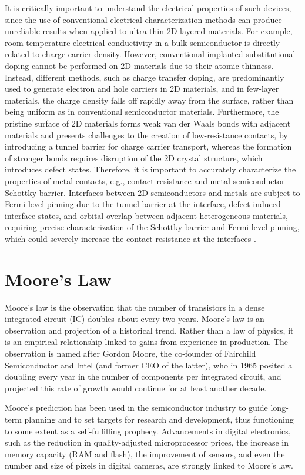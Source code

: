 \documentclass[12pt,a4paper]{report}
\begin{document}
It is critically important to understand the electrical properties of such devices, since the use of conventional electrical characterization methods can produce unreliable results when applied to ultra-thin 2D layered materials. For example, room-temperature electrical conductivity in a bulk semiconductor is directly related to charge carrier density. However, conventional implanted substitutional doping cannot be performed on 2D materials due to their atomic thinness. Instead, different methods, such as charge transfer doping, are predominantly used to generate electron and hole carriers in 2D materials, and in few-layer materials, the charge density falls off rapidly away from the surface, rather than being uniform as in conventional semiconductor materials. Furthermore, the pristine surface of 2D materials forms weak van der Waals bonds with adjacent materials and presents challenges to the creation of low-resistance contacts, by introducing a tunnel barrier for charge carrier transport, whereas the formation of stronger bonds requires disruption of the 2D crystal structure, which introduces defect states. Therefore, it is important to accurately characterize the properties of metal contacts, e.g., contact resistance and metal-semiconductor Schottky barrier. Interfaces between 2D semiconductors and metals are subject to Fermi level pinning due to the tunnel barrier at the interface, defect-induced interface states, and orbital overlap between adjacent heterogeneous materials, requiring precise characterization of the Schottky barrier and Fermi level pinning, which could severely increase the contact resistance at the interfaces .



\section{Moore's Law}
Moore's law is the observation that the number of transistors in a dense integrated circuit (IC) doubles about every two years. Moore's law is an observation and projection of a historical trend. Rather than a law of physics, it is an empirical relationship linked to gains from experience in production. The observation is named after Gordon Moore, the co-founder of Fairchild Semiconductor and Intel (and former CEO of the latter), who in 1965 posited a doubling every year in the number of components per integrated circuit, and projected this rate of growth would continue for at least another decade. 

Moore's prediction has been used in the semiconductor industry to guide long-term planning and to set targets for research and development, thus functioning to some extent as a self-fulfilling prophecy. Advancements in digital electronics, such as the reduction in quality-adjusted microprocessor prices, the increase in memory capacity (RAM and flash), the improvement of sensors, and even the number and size of pixels in digital cameras, are strongly linked to Moore's law. 
\end{document}
